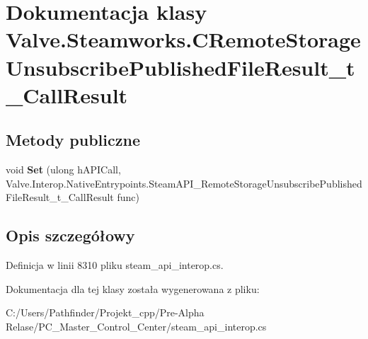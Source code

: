 \hypertarget{class_valve_1_1_steamworks_1_1_c_remote_storage_unsubscribe_published_file_result__t___call_result}{}\section{Dokumentacja klasy Valve.\+Steamworks.\+C\+Remote\+Storage\+Unsubscribe\+Published\+File\+Result\+\_\+t\+\_\+\+Call\+Result}
\label{class_valve_1_1_steamworks_1_1_c_remote_storage_unsubscribe_published_file_result__t___call_result}
\subsection*{Metody publiczne}
\begin{DoxyCompactItemize}
\item 
\mbox{\label{class_valve_1_1_steamworks_1_1_c_remote_storage_unsubscribe_published_file_result__t___call_result_a2c161c5251f1d5adf0956ffc5fb55972}} 
void {\bfseries Set} (ulong h\+A\+P\+I\+Call, Valve.\+Interop.\+Native\+Entrypoints.\+Steam\+A\+P\+I\+\_\+\+Remote\+Storage\+Unsubscribe\+Published\+File\+Result\+\_\+t\+\_\+\+Call\+Result func)
\end{DoxyCompactItemize}


\subsection{Opis szczegółowy}


Definicja w linii 8310 pliku steam\+\_\+api\+\_\+interop.\+cs.



Dokumentacja dla tej klasy została wygenerowana z pliku\+:\begin{DoxyCompactItemize}
\item 
C\+:/\+Users/\+Pathfinder/\+Projekt\+\_\+cpp/\+Pre-\/\+Alpha Relase/\+P\+C\+\_\+\+Master\+\_\+\+Control\+\_\+\+Center/steam\+\_\+api\+\_\+interop.\+cs\end{DoxyCompactItemize}

